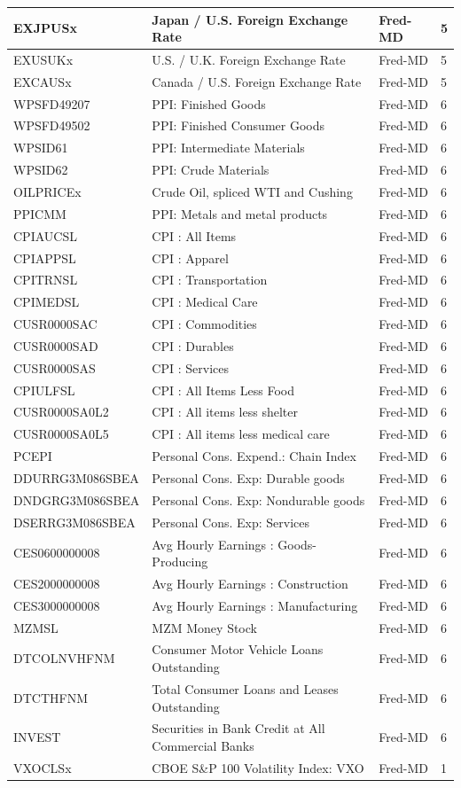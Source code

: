 \documentclass[11pt]{article}
\theoremstyle{plain}
\theoremstyle{definition}
\theoremstyle{remark}
\numberwithin{equation}{section}
\begin{document}
{\begin{longtable}{|l|l|l|l|}
EXJPUSx & Japan / U.S. Foreign Exchange Rate & Fred-MD & 5 \\ \hline
EXUSUKx & U.S. / U.K. Foreign Exchange Rate & Fred-MD & 5 \\ \hline
EXCAUSx & Canada / U.S. Foreign Exchange Rate & Fred-MD & 5 \\ \hline
WPSFD49207 & PPI: Finished Goods & Fred-MD & 6 \\ \hline
WPSFD49502 & PPI: Finished Consumer Goods & Fred-MD & 6 \\ \hline
WPSID61 & PPI: Intermediate Materials & Fred-MD & 6 \\ \hline
WPSID62 & PPI: Crude Materials & Fred-MD & 6 \\ \hline
OILPRICEx & Crude Oil, spliced WTI and Cushing & Fred-MD & 6 \\ \hline
PPICMM & PPI: Metals and metal products & Fred-MD & 6 \\ \hline
CPIAUCSL & CPI : All Items & Fred-MD & 6 \\ \hline
CPIAPPSL & CPI : Apparel & Fred-MD & 6 \\ \hline
CPITRNSL & CPI : Transportation & Fred-MD & 6 \\ \hline
CPIMEDSL & CPI : Medical Care & Fred-MD & 6 \\ \hline
CUSR0000SAC & CPI : Commodities & Fred-MD & 6 \\ \hline
CUSR0000SAD & CPI : Durables & Fred-MD & 6 \\ \hline
CUSR0000SAS & CPI : Services & Fred-MD & 6 \\ \hline
CPIULFSL & CPI : All Items Less Food & Fred-MD & 6 \\ \hline
CUSR0000SA0L2 & CPI : All items less shelter & Fred-MD & 6 \\ \hline
CUSR0000SA0L5 & CPI : All items less medical care & Fred-MD & 6 \\ \hline
PCEPI & Personal Cons. Expend.: Chain Index & Fred-MD & 6 \\ \hline
DDURRG3M086SBEA & Personal Cons. Exp: Durable goods & Fred-MD & 6 \\ \hline
DNDGRG3M086SBEA & Personal Cons. Exp: Nondurable goods & Fred-MD & 6 \\ \hline
DSERRG3M086SBEA & Personal Cons. Exp: Services & Fred-MD & 6 \\ \hline
CES0600000008 & Avg Hourly Earnings : Goods-Producing & Fred-MD & 6 \\ \hline
CES2000000008 & Avg Hourly Earnings : Construction & Fred-MD & 6 \\ \hline
CES3000000008 & Avg Hourly Earnings : Manufacturing & Fred-MD & 6 \\ \hline
MZMSL & MZM Money Stock & Fred-MD & 6 \\ \hline
DTCOLNVHFNM & Consumer Motor Vehicle Loans Outstanding & Fred-MD & 6 \\ \hline
DTCTHFNM & Total Consumer Loans and Leases Outstanding & Fred-MD & 6 \\ \hline
INVEST & Securities in Bank Credit at All Commercial Banks & Fred-MD & 6 \\ \hline
VXOCLSx & CBOE S\&P 100 Volatility Index: VXO & Fred-MD & 1 \\ \hline


\end{longtable}}
\end{document}
